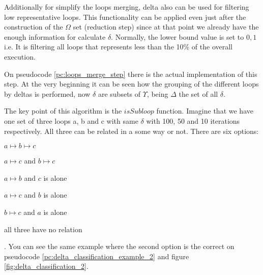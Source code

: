 Additionally for simplify the loops merging, delta also can be used for
filtering low representative loops. This functionality can be applied even
just after the construction of the $\Omega$ set (reduction step) since at that
point we already have the enough information for calculate $\delta$. Normally,
the lower bound value is set to $0,1$ i.e. It is filtering all loops that
represents less than the 10\% of the overall execution.

On pseudocode \ref{pc:loops_merge_step} there is the actual implementation of
this step. At the very beginning it can be seen how the grouping of the
different loops by deltas is performed, now $\delta$ are subsets of
$\Upsilon$, being $\Delta$ the set of all $\delta$.

\begin{pseudocode}{Loops merge step}{\Upsilon}
\label{pc:loops_merge_step}
    \Delta \GETS deltaClassification(\Upsilon) \\
    \FORALL \delta \in \Delta \DO 
    \BEGIN
         \\
        sort(\upsilon \in \delta) \\
        \FOR i \in [0, |\delta|-1) \DO
        \BEGIN
            \FOR j \in [i+1, |\delta|) \DO
            \BEGIN
              \IF isSubloop(\upsilon_{i}, \upsilon{j}) \THEN
                  \upsilon_{i} \mapsto \upsilon_{j} \\
            \END
        \END
    \END
\end{pseudocode}

The key point of this
algorithm is the $isSubloop$ function. Imagine that we have one set of three loops
a, b and c with same $\delta$ with 100, 50 and 10 iterations respectively. 
All three can be related in a some way or not. There are six options:
\begin{enumerate*}[label=\roman*)]
    \item $a \mapsto b \mapsto c$
    \item $a \mapsto c$ and $b \mapsto c$
    \item $a \mapsto b$ and $c$ is alone
    \item $a \mapsto c$ and $b$ is alone
    \item $b \mapsto c$ and $a$ is alone
    \item all three have no relation
\end{enumerate*}. You can see the same example where the second option is the
correct on pseudocode
\ref{pc:delta_classification_example_2} and figure
\ref{fig:delta_classification_2}.


